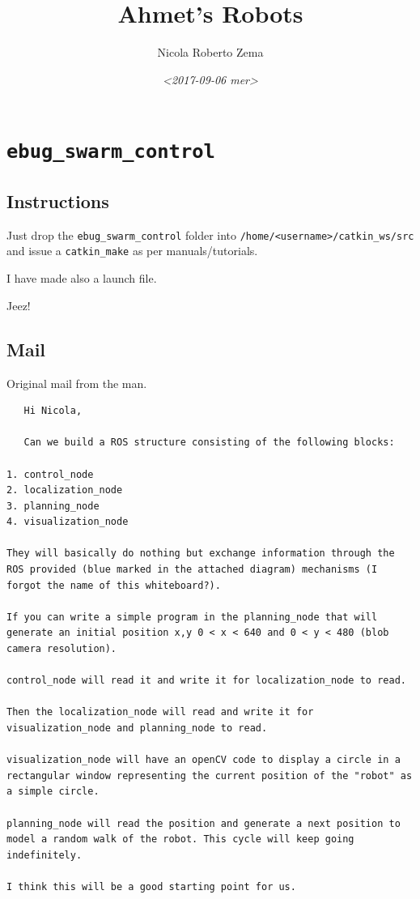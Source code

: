\documentclass{article}
\author{Nicola Roberto Zema}
\date{\textit{<2017-09-06 mer>}}
\title{Ahmet's Robots}
\begin{document}
\maketitle
\tableofcontents



\section{\texttt{ebug\_swarm\_control}}
\label{sec-1}

\subsection{Instructions}
\label{sec-1-1}

Just drop the \texttt{ebug\_swarm\_control} folder into
\texttt{/home/<username>/catkin\_ws/src} and issue a \verb~catkin_make~ as per
manuals/tutorials.

I have made also a launch file.

Jeez!

\subsection{Mail}
\label{sec-1-2}
Original mail from the man.
\begin{verbatim}
   Hi Nicola,
   
   Can we build a ROS structure consisting of the following blocks:

1. control_node
2. localization_node
3. planning_node
4. visualization_node
   
They will basically do nothing but exchange information through the
ROS provided (blue marked in the attached diagram) mechanisms (I
forgot the name of this whiteboard?).

If you can write a simple program in the planning_node that will
generate an initial position x,y 0 < x < 640 and 0 < y < 480 (blob
camera resolution).

control_node will read it and write it for localization_node to read.

Then the localization_node will read and write it for
visualization_node and planning_node to read.

visualization_node will have an openCV code to display a circle in a
rectangular window representing the current position of the "robot" as
a simple circle.

planning_node will read the position and generate a next position to
model a random walk of the robot. This cycle will keep going
indefinitely.

I think this will be a good starting point for us.
\end{verbatim}
\end{document}

